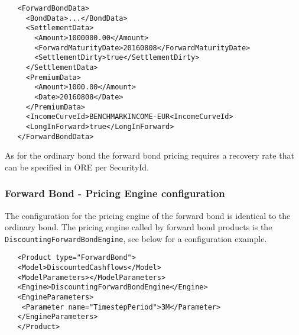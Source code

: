   \begin{verbatim}
   <ForwardBondData>
     <BondData>...</BondData>
     <SettlementData>
       <Amount>1000000.00</Amount>
       <ForwardMaturityDate>20160808</ForwardMaturityDate>
       <SettlementDirty>true</SettlementDirty>
     </SettlementData>
     <PremiumData>
       <Amount>1000.00</Amount>
       <Date>20160808</Date>
     </PremiumData>
     <IncomeCurveId>BENCHMARKINCOME-EUR<IncomeCurveId>
     <LongInForward>true</LongInForward>
   </ForwardBondData>
   \end{verbatim}


As for the ordinary bond the forward bond pricing requires a recovery rate that can be specified in ORE per SecurityId.

\subsubsection*{Forward Bond - Pricing Engine configuration}

The configuration for the pricing engine of the forward bond is identical to the ordinary bond.%
The pricing engine called by forward bond products is the {\tt DiscountingForwardBondEngine}, see below for a configuration example.

   \begin{verbatim}
   <Product type="ForwardBond">
   <Model>DiscountedCashflows</Model>
   <ModelParameters></ModelParameters>
   <Engine>DiscountingForwardBondEngine</Engine>
   <EngineParameters>
    <Parameter name="TimestepPeriod">3M</Parameter>
   </EngineParameters>
   </Product>
   \end{verbatim}
